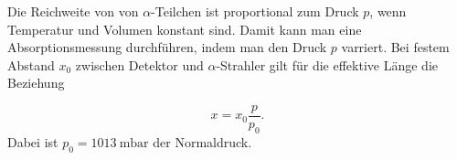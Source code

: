 Die Reichweite von von $\alpha$-Teilchen ist proportional zum Druck $p$, wenn Temperatur und Volumen konstant sind. Damit kann man eine Absorptionsmessung durchführen, indem man den Druck $p$ varriert. Bei festem Abstand $x_\text{0}$ zwischen Detektor und $\alpha$-Strahler gilt für die effektive Länge die Beziehung 

\begin{equation}
    x = x_\text{0} \frac{p}{p_\text{0}}.
    \label{eqn:abstand}
\end{equation}
Dabei ist $p_\text{0}= \SI{1013}{\milli\bar}$ der Normaldruck. 
